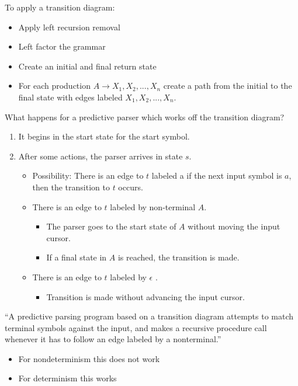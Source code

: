 \documentclass[11pt]{article}
\begin{document}
To apply a transition diagram:
\begin{itemize}
\item Apply left recursion removal
\item Left factor the grammar
\item Create an initial and final return state
\item For each production $A\to X_1, X_2, ...,X_n$ create a path from the initial to the final state with edges labeled $X_1, X_2, ...,X_n$.
\end{itemize}

What happens for a predictive parser which works off the transition diagram?
\begin{enumerate}
\item It begins in the start state for the start symbol.
\item After some actions, the parser arrives in state $s$.
\begin{itemize}
\item Possibility: There is an edge to $t$ labeled a if the next input symbol is $a$, then the transition to $t$ occurs.  
\item There is an edge to $t$ labeled by non-terminal $A$.\begin{itemize}
\item The parser goes to the start state of $A$ without moving the input cursor.
\item If a final state in $A$ is reached, the transition is made.
\end{itemize}
\item There is an edge to $t$ labeled by $\epsilon$ .
\begin{itemize}
\item Transition is made without advancing the input cursor.
\end{itemize}


\end{itemize}

\end{enumerate}
``A predictive parsing program based on a transition diagram attempts to match terminal symbols against the input, and makes a recursive procedure call whenever it has to follow an edge labeled by a nonterminal.''
\begin{itemize}
\item For nondeterminism this does not work
\item For determinism this works
\end{itemize}
\end{document}
